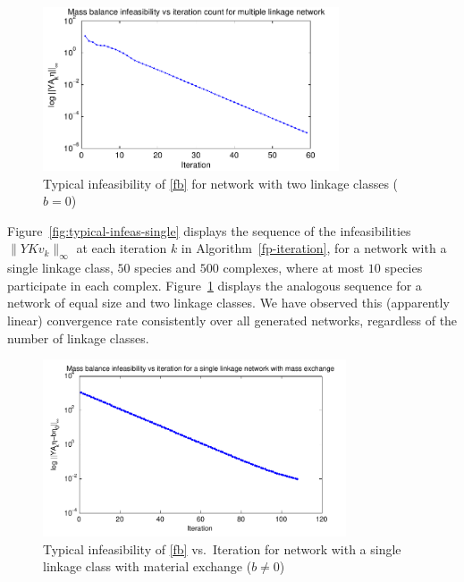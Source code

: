\documentclass[smallextended]{svjour3}       %
\newcommand*{\0}{\mathbf{0}}
\newcommand*{\1}{\mathbf{1}}
\begin{document}
\begin{figure}%
   \centering
   \includegraphics[width=0.78\textwidth]{InfeasibilityVsIterationMultiple}
   \caption{Typical infeasibility of \eqref{fb} for network with
            two linkage classes ($b=0$)}
   \label{fig:typical-infeas-multiple}
\end{figure}

Figure~\ref{fig:typical-infeas-single} displays the sequence of the
infeasibilities $\|YKv_k\|_\infty$ at each iteration $k$ in
Algorithm~\ref{fp-iteration}, for a network with a single
linkage class, $50$ species and $500$ complexes, where at
most $10$ species participate in each
complex. Figure~\ref{fig:typical-infeas-multiple} displays the
analogous sequence for a network of equal size and two
linkage classes.  We have observed this (apparently linear)
convergence rate consistently over all generated networks, regardless
of the number of linkage classes.

\begin{figure}%
   \centering 
   \includegraphics[width=0.8\textwidth]{InfeasibilityVsIterationOpen}
   \caption{Typical infeasibility of \eqref{fb} vs.\ Iteration for network with a
            single linkage class with material exchange ($b\neq0$)} 
   \label{fig:typical-infeas-single-open} 
\end{figure}
\end{document}
